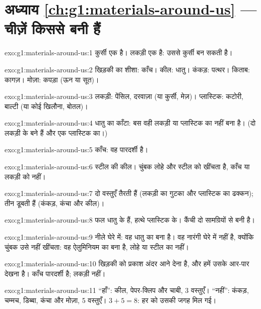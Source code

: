 \section*{अध्याय \ref{ch:g1:materials-around-us} --- चीज़ें किससे बनी हैं}

\begin{solution}{exo:g1:materials-around-us:1}
कुर्सी एक  है। लकड़ी एक  है: उससे कुर्सी बन सकती है।
\end{solution}

\begin{solution}{exo:g1:materials-around-us:2}
खिड़की का शीशा: काँच। कील: धातु। कंकड़: पत्थर। किताब: कागज़। मोज़ा:
कपड़ा (ऊन या सूत)।
\end{solution}

\begin{solution}{exo:g1:materials-around-us:3}
लकड़ी: पेंसिल, दरवाज़ा (या कुर्सी, मेज़)। प्लास्टिक: कटोरी, बाल्टी
(या कोई खिलौना, बोतल)।
\end{solution}

\begin{solution}{exo:g1:materials-around-us:4}
धातु का काँटा: बस वही लकड़ी या प्लास्टिक का नहीं बना है। (दो लकड़ी
के बने हैं और एक प्लास्टिक का।)
\end{solution}

\begin{solution}{exo:g1:materials-around-us:5}
काँच: वह पारदर्शी है।
\end{solution}

\begin{solution}{exo:g1:materials-around-us:6}
स्टील की कील। चुंबक लोहे और स्टील को खींचता है, काँच या लकड़ी को नहीं।
\end{solution}

\begin{solution}{exo:g1:materials-around-us:7}
दो वस्तुएँ तैरती हैं (लकड़ी का गुटका और प्लास्टिक का ढक्कन); तीन डूबती
हैं (कंकड़, कंचा और कील)।
\end{solution}

\begin{solution}{exo:g1:materials-around-us:8}
फल धातु के हैं, हत्थे प्लास्टिक के। कैंची दो सामग्रियों से
बनी है।
\end{solution}

\begin{solution}{exo:g1:materials-around-us:9}
नीले घेरे में: वह धातु का बना है। वह नारंगी घेरे में नहीं है,
क्योंकि चुंबक उसे नहीं खींचता: वह ऐलुमिनियम का बना है, लोहे या
स्टील का नहीं।
\end{solution}

\begin{solution}{exo:g1:materials-around-us:10}
खिड़की को प्रकाश अंदर आने देना है, और हमें उसके आर-पार देखना है। काँच
पारदर्शी है; लकड़ी नहीं।
\end{solution}

\begin{solution}{exo:g1:materials-around-us:11}
``हाँ'': कील, पेपर-क्लिप और चाबी, 3 वस्तुएँ। ``नहीं'': कंकड़,
चम्मच, डिब्बा, कंचा और मोज़ा, 5 वस्तुएँ।
$3 + 5 = 8$: हर  को उसकी जगह मिल गई।
\end{solution}
